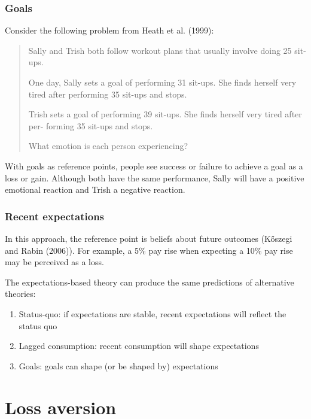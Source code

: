 \documentclass[
  letterpaper,
  DIV=11,
  numbers=noendperiod]{scrreprt}
\providecommand{\tightlist}{%
  \setlength{\itemsep}{0pt}\setlength{\parskip}{0pt}}\usepackage{longtable,booktabs,array}
\begin{document}
\hypertarget{goals}{%
\subsection{Goals}\label{goals}}

Consider the following problem from Heath et al. (1999):

\begin{quote}
Sally and Trish both follow workout plans that usually involve doing 25
sit-ups.

One day, Sally sets a goal of performing 31 sit-ups. She finds herself
very tired after performing 35 sit-ups and stops.

Trish sets a goal of performing 39 sit-ups. She finds herself very tired
after per- forming 35 sit-ups and stops.

What emotion is each person experiencing?
\end{quote}

With goals as reference points, people see success or failure to achieve
a goal as a loss or gain. Although both have the same performance, Sally
will have a positive emotional reaction and Trish a negative reaction.

\hypertarget{recent-expectations}{%
\subsection{Recent expectations}\label{recent-expectations}}

In this approach, the reference point is beliefs about future outcomes
(Kőszegi and Rabin (2006)). For example, a 5\% pay rise when expecting a
10\% pay rise may be perceived as a loss.

The expectations-based theory can produce the same predictions of
alternative theories:

\begin{enumerate}
\def\labelenumi{\arabic{enumi}.}
\tightlist
\item
  Status-quo: if expectations are stable, recent expectations will
  reflect the status quo
\item
  Lagged consumption: recent consumption will shape expectations
\item
  Goals: goals can shape (or be shaped by) expectations
\end{enumerate}

\hypertarget{loss-aversion}{%
\chapter{Loss aversion}\label{loss-aversion}}
\end{document}
